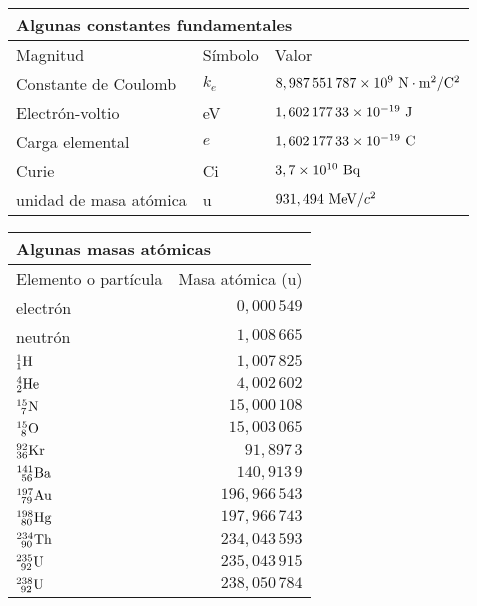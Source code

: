 \documentclass[11pt]{articulo}
\begin{document}
\begingroup
\renewcommand{\arraystretch}{1.5} %
\begin{tabular}{lll}
\multicolumn{3}{l}{Algunas constantes fundamentales}\\
\hline
Magnitud & S\'imbolo & Valor\\
\hline
Constante de Coulomb     & $k_e$ & ${\rm 8,987\,551\,787 \times 10^9~N \cdot m^2 / C^2}$\\
Electr\'on-voltio        & eV    & ${\rm 1,602\,177\,33 \times 10^{-19}~J}$\\
Carga elemental          & $e$   & ${\rm 1,602\,177\,33 \times 10^{-19}~C}$\\
Curie                    & Ci    & ${\rm 3,7 \times 10^{10}~Bq}$\\
unidad de masa at\'omica & u     & $931,494~{\rm MeV}/c^2$\\
\hline
\end{tabular}
\endgroup

\vspace*{0.5cm}

\begingroup
\renewcommand{\arraystretch}{1.5} %
\begin{tabular}{lr}
\multicolumn{2}{l}{Algunas masas at\'omicas}\\
\hline
Elemento o part\'icula & Masa at\'omica (u)\\
\hline
electr\'on             & $  0,000\,549$\\
neutr\'on              & $  1,008\,665$\\
${\rm _{1}^{1}H}$      & $  1,007\,825$\\
${\rm _{2}^{4}He}$     & $  4,002\,602$\\
${\rm _{~7}^{15}N}$    & $ 15,000\,108$\\
${\rm _{~8}^{15}O}$    & $ 15,003\,065$\\
${\rm _{36}^{92}Kr}$   & $ 91,897\,3$\\
${\rm _{~56}^{141}Ba}$ & $140,913\,9$\\
${\rm _{~79}^{197}Au}$ & $196,966\,543$\\
${\rm _{~80}^{198}Hg}$ & $197,966\,743$\\
${\rm _{~90}^{234}Th}$ & $234,043\,593$\\
${\rm _{~92}^{235}U}$  & $235,043\,915$\\
${\rm _{~92}^{238}U}$  & $238,050\,784$\\
\hline
\end{tabular}
\endgroup
\end{document}
